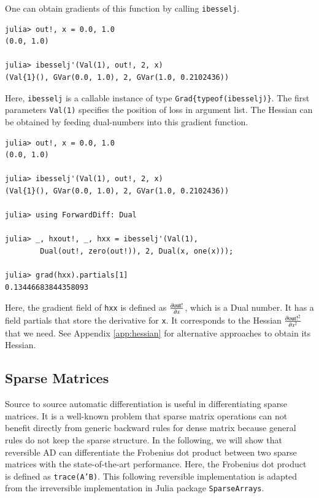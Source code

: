 \documentclass{article}
\newcommand{\<}{\langle}
\renewcommand{\>}{\rangle}
\newcommand{\App}[1]{Appendix \ref{#1}}
\theoremstyle{definition}\newtheorem{definition}{\textit{Definition}}
\begin{document}
One can obtain gradients of this function by calling \texttt{ibesselj\textquotesingle}.

\begin{minipage}{.88\columnwidth}
\begin{lstlisting}
julia> out!, x = 0.0, 1.0
(0.0, 1.0)

julia> ibesselj'(Val(1), out!, 2, x)
(Val{1}(), GVar(0.0, 1.0), 2, GVar(1.0, 0.2102436))
\end{lstlisting}
\end{minipage}

Here, \texttt{ibesselj\textquotesingle} is a callable instance of type \texttt{Grad\{typeof(ibesselj)\}}. The first parameters \texttt{Val(1)} specifies the position of loss in argument list. 
The Hessian can be obtained by feeding dual-numbers into this gradient function.

\begin{minipage}{.88\columnwidth}
\begin{lstlisting}
julia> out!, x = 0.0, 1.0
(0.0, 1.0)

julia> ibesselj'(Val(1), out!, 2, x)
(Val{1}(), GVar(0.0, 1.0), 2, GVar(1.0, 0.2102436))

julia> using ForwardDiff: Dual

julia> _, hxout!, _, hxx = ibesselj'(Val(1), 
        Dual(out!, zero(out!)), 2, Dual(x, one(x)));

julia> grad(hxx).partials[1]
0.13446683844358093
\end{lstlisting}
\end{minipage}

Here, the gradient field of \texttt{hxx} is defined as $\frac{\partial {\rm out!}}{\partial x}$, which is a Dual number.
It has a field partials that store the derivative for \texttt{x}.
It corresponds to the Hessian $\frac{\partial{\rm out!}^2}{\partial x^2}$ that we need.
See \App{app:hessian} for alternative approaches to obtain its Hessian.

\subsection{Sparse Matrices}
Source to source automatic differentiation is useful in differentiating sparse matrices. It is a well-known problem that sparse matrix operations can not benefit directly from generic backward rules for dense matrix because general rules do not keep the sparse structure.
In the following, we will show that reversible AD can differentiate the Frobenius dot product between two sparse matrices with the state-of-the-art performance. Here, the Frobenius dot product is defined as \texttt{trace(A'B)}.
This following reversible implementation is adapted from the irreversible implementation in Julia package \texttt{SparseArrays}.
\end{document}
